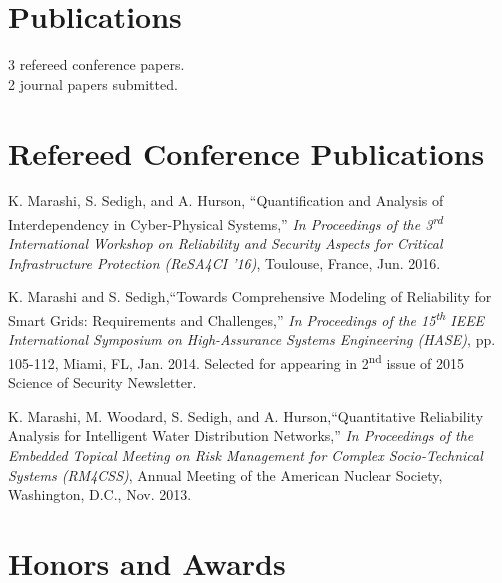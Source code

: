 \documentclass[10pt]{article}
\newlength{\Vspace}
\newlength{\Vspace}
\newlength{\VspacePub}
\begin{document}
\ifResume
\section{Publications}

\begin{flushleft}
3 refereed conference papers. \\
2 journal papers submitted.
\end{flushleft}

\else
\section{Refereed Conference Publications}

\begin{flushleft}
K. Marashi, S. Sedigh, and A. Hurson, ``Quantification and Analysis of Interdependency in Cyber-Physical Systems,'' \textit{In Proceedings of the 3\textsuperscript{rd} International Workshop on Reliability and Security Aspects for Critical Infrastructure Protection (ReSA4CI '16)}, Toulouse, France, Jun. 2016. \\ \vspace{\VspacePub}

K. Marashi and S. Sedigh,``Towards Comprehensive Modeling of Reliability for Smart Grids: Requirements and Challenges,''
\textit{In Proceedings of the 15\textsuperscript{th} IEEE International Symposium on High-Assurance Systems Engineering (HASE)}, pp. 105-112, Miami, FL, Jan. 2014. Selected for appearing in 2\textsuperscript{nd} issue of 2015 Science of Security Newsletter. \\ \vspace{\VspacePub}

K. Marashi, M. Woodard, S. Sedigh, and A. Hurson,``Quantitative Reliability Analysis for Intelligent Water Distribution Networks,'' \textit{In Proceedings of the Embedded Topical Meeting on Risk Management for Complex Socio-Technical Systems (RM4CSS)}, Annual Meeting of the American Nuclear Society, Washington, D.C., Nov. 2013.

\end{flushleft}
\fi

\section{Honors and Awards}
\end{document}
